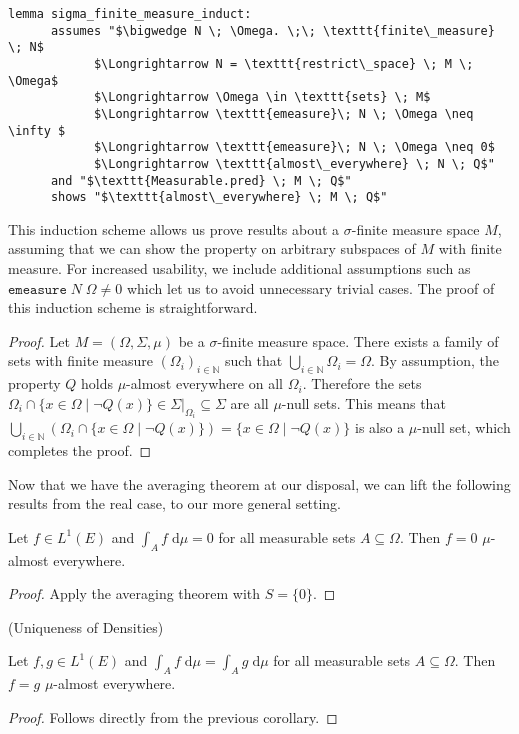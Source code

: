 \begin{isalemma}
{\small
	\begin{lstlisting}[style=isabelle]
	lemma sigma_finite_measure_induct:
	  assumes "$\bigwedge N \; \Omega. \;\; \texttt{finite\_measure} \; N$
			$\Longrightarrow N = \texttt{restrict\_space} \; M \; \Omega$
			$\Longrightarrow \Omega \in \texttt{sets} \; M$
			$\Longrightarrow \texttt{emeasure}\; N \; \Omega \neq \infty $
			$\Longrightarrow \texttt{emeasure}\; N \; \Omega \neq 0$
			$\Longrightarrow \texttt{almost\_everywhere} \; N \; Q$"
	  and "$\texttt{Measurable.pred} \; M \; Q$"
	  shows "$\texttt{almost\_everywhere} \; M \; Q$"
	\end{lstlisting}
}
\end{isalemma}

This induction scheme allows us prove results about a $\sigma$-finite measure space $M$, assuming that we can show the property on arbitrary subspaces of $M$ with finite measure. For increased usability, we include additional assumptions such as $\texttt{emeasure}\; N \; \Omega \neq 0$ which let us to avoid unnecessary trivial cases. The proof of this induction scheme is straightforward.
\begin{proof}
Let $M = (\Omega, \Sigma, \mu)$ be a $\sigma$-finite measure space. There exists a family of sets with finite measure $(\Omega_i)_{i \in \mathbb{N}}$ such that $\bigcup_{i \in \mathbb{N}} \Omega_i = \Omega$. By assumption, the property $Q$ holds $\mu$-almost everywhere on all $\Omega_i$. Therefore the sets $\Omega_i \cap \{x \in \Omega \;\vert\; \neg Q(x)\} \in \Sigma\vert_{\Omega_i} \subseteq \Sigma$ are all $\mu$-null sets. This means that $\bigcup_{i \in \mathbb{N}} (\Omega_i \cap \{x \in \Omega \;\vert\; \neg Q(x)\}) = \{x \in \Omega \;\vert\; \neg Q(x)\}$ is also a $\mu$-null set, which completes the proof.
\end{proof}

Now that we have the averaging theorem at our disposal, we can lift the following results from the real case, to our more general setting.

\begin{corollary}
	Let $f \in L^1(E)$ and $\int_A f \;\textrm{d}\mu = 0$ for all measurable sets $A \subseteq \Omega$. Then $f = 0$ $\mu$-almost everywhere.
\end{corollary}
\begin{proof}
	Apply the averaging theorem with $S = \{0\}$.
\end{proof}

\begin{corollary}\label{cor:density_unique} (Uniqueness of Densities) \par
	Let $f, g \in L^1(E)$ and $\int_A f \;\textrm{d}\mu = \int_A g \;\textrm{d}\mu$ for all measurable sets $A \subseteq \Omega$. Then $f = g$ $\mu$-almost everywhere.
\end{corollary}
\begin{proof}
	Follows directly from the previous corollary.
\end{proof}

